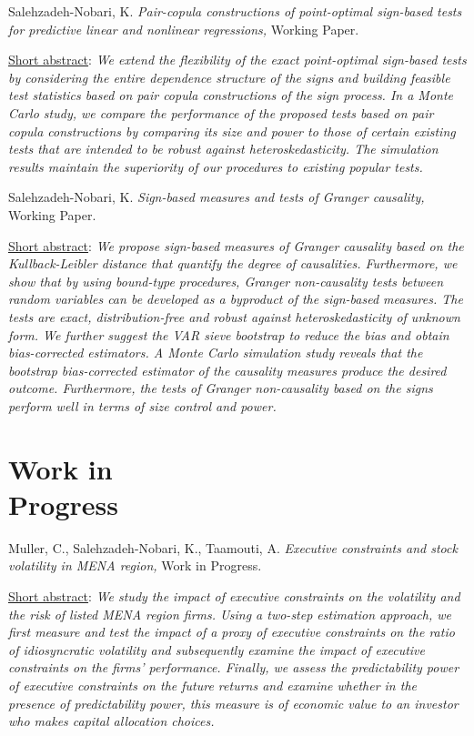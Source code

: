 \documentclass[margin,line,pifont,palatino,courier]{res}
\begin{document}
\begin{resume}
Salehzadeh-Nobari, K. \emph{Pair-copula constructions of point-optimal sign-based tests for predictive linear and nonlinear regressions,} Working Paper.

\underline{Short abstract}: \emph{We extend the flexibility of the exact point-optimal sign-based tests by considering the entire dependence structure of the signs and building feasible test statistics based on pair copula constructions of the sign process. In a Monte Carlo study, we compare the performance of the proposed tests based on pair copula constructions by comparing its size and power to those of certain existing tests that are intended to be robust against heteroskedasticity. The simulation results maintain the superiority of our procedures to existing popular tests.}

\vspace{+4ex}
Salehzadeh-Nobari, K. \emph{Sign-based measures and tests of Granger causality,} Working Paper.

\underline{Short abstract}:  \emph{We propose sign-based measures of Granger causality based on the Kullback-Leibler distance that quantify the degree of causalities. Furthermore, we show that by using bound-type procedures, Granger non-causality tests between random variables can be developed as a byproduct of the sign-based measures. The tests are exact, distribution-free and robust against heteroskedasticity of unknown form. We further suggest the VAR sieve bootstrap to reduce the bias and obtain bias-corrected estimators. A Monte Carlo simulation study reveals that the bootstrap bias-corrected estimator of the causality measures produce the desired outcome. Furthermore, the tests of Granger non-causality based on the signs perform well in terms of size control and power.}

\hrulefill

\section{\sc \bf Work in\\
Progress}

Muller, C., Salehzadeh-Nobari, K., Taamouti, A. \emph{Executive constraints and stock volatility in MENA region,} Work in Progress.

\underline{Short abstract}: \emph{We study the impact of executive constraints on the volatility and the risk of listed MENA region firms. Using a two-step estimation approach, we first measure and test the impact of a proxy of executive constraints on the ratio of idiosyncratic volatility and subsequently examine the impact of executive constraints on the firms' performance. Finally, we assess the predictability power of executive constraints on the future returns and examine whether in the presence of predictability power, this measure is of economic value to an investor who makes capital allocation choices.}


\end{resume}
\end{document}
